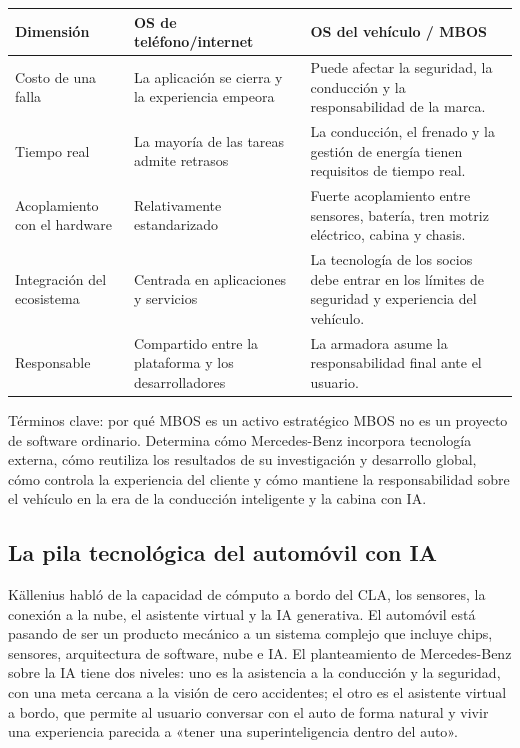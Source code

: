 \noindent\begin{tabularx}{\textwidth}{p{}p{}X}
\toprule
Dimensión & OS de teléfono/internet & OS del vehículo / MBOS \\
\midrule
Costo de una falla & La aplicación se cierra y la experiencia empeora & Puede afectar la seguridad, la conducción y la responsabilidad de la marca. \\
Tiempo real & La mayoría de las tareas admite retrasos & La conducción, el frenado y la gestión de energía tienen requisitos de tiempo real. \\
Acoplamiento con el hardware & Relativamente estandarizado & Fuerte acoplamiento entre sensores, batería, tren motriz eléctrico, cabina y chasis. \\
Integración del ecosistema & Centrada en aplicaciones y servicios & La tecnología de los socios debe entrar en los límites de seguridad y experiencia del vehículo. \\
Responsable & Compartido entre la plataforma y los desarrolladores & La armadora asume la responsabilidad final ante el usuario. \\
\bottomrule
\end{tabularx}

\begin{knowledgebox}{Términos clave: por qué MBOS es un activo estratégico}
MBOS no es un proyecto de software ordinario. Determina cómo Mercedes-Benz incorpora tecnología externa, cómo reutiliza los resultados de su investigación y desarrollo global, cómo controla la experiencia del cliente y cómo mantiene la responsabilidad sobre el vehículo en la era de la conducción inteligente y la cabina con IA.
\end{knowledgebox}

\subsection{La pila tecnológica del automóvil con IA}

Källenius habló de la capacidad de cómputo a bordo del CLA, los sensores, la conexión a la nube, el asistente virtual y la IA generativa. El automóvil está pasando de ser un producto mecánico a un sistema complejo que incluye chips, sensores, arquitectura de software, nube e IA. El planteamiento de Mercedes-Benz sobre la IA tiene dos niveles: uno es la asistencia a la conducción y la seguridad, con una meta cercana a la visión de cero accidentes; el otro es el asistente virtual a bordo, que permite al usuario conversar con el auto de forma natural y vivir una experiencia parecida a «tener una superinteligencia dentro del auto».

